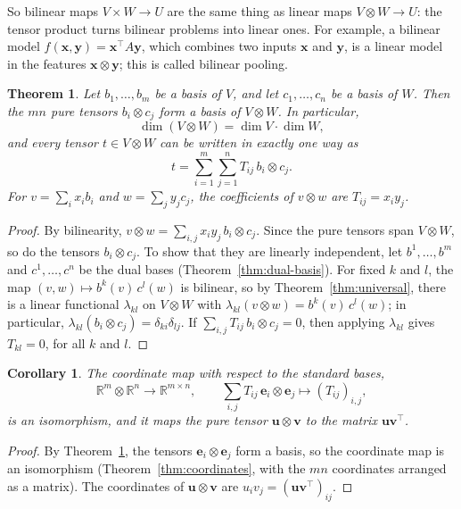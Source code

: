 \documentclass[11pt]{article}
\theoremstyle{definition}
\theoremstyle{plain}
\newtheorem{theorem}[definition]{Theorem}
\newtheorem{corollary}[definition]{Corollary}
\theoremstyle{remark}
\begin{document}
So bilinear maps $V \times W \to U$ are the same thing as linear maps $V \otimes W \to U$: the tensor product turns bilinear problems into linear ones. For example, a bilinear model $f(\mathbf{x}, \mathbf{y}) = \mathbf{x}^\top A\mathbf{y}$, which combines two inputs $\mathbf{x}$ and $\mathbf{y}$, is a linear model in the features $\mathbf{x} \otimes \mathbf{y}$; this is called bilinear pooling.

\begin{theorem}\label{thm:tensor-basis}
    Let $b_1, \ldots, b_m$ be a basis of $V$, and let $c_1, \ldots, c_n$ be a basis of $W$. Then the $mn$ pure tensors $b_i \otimes c_j$ form a basis of $V \otimes W$. In particular,
    \[\dim(V \otimes W) = \dim V \cdot \dim W,\]
    and every tensor $t \in V \otimes W$ can be written in exactly one way as
    \[t = \sum_{i=1}^m \sum_{j=1}^n T_{ij}\, b_i \otimes c_j.\]
    For $v = \sum_i x_ib_i$ and $w = \sum_j y_jc_j$, the coefficients of $v \otimes w$ are $T_{ij} = x_iy_j$.
\end{theorem}

\begin{proof}
    By bilinearity, $v \otimes w = \sum_{i,j} x_iy_j\, b_i \otimes c_j$. Since the pure tensors span $V \otimes W$, so do the tensors $b_i \otimes c_j$. To show that they are linearly independent, let $b^1, \ldots, b^m$ and $c^1, \ldots, c^n$ be the dual bases (Theorem~\ref{thm:dual-basis}). For fixed $k$ and $l$, the map $(v, w) \mapsto b^k(v)\,c^l(w)$ is bilinear, so by Theorem~\ref{thm:universal}, there is a linear functional $\lambda_{kl}$ on $V \otimes W$ with $\lambda_{kl}(v \otimes w) = b^k(v)\,c^l(w)$; in particular, $\lambda_{kl}(b_i \otimes c_j) = \delta_{ki}\delta_{lj}$. If $\sum_{i,j} T_{ij}\, b_i \otimes c_j = 0$, then applying $\lambda_{kl}$ gives $T_{kl} = 0$, for all $k$ and $l$.
\end{proof}

\begin{corollary}\label{cor:tensor-matrices}
    The coordinate map with respect to the standard bases,
    \[\mathbb{R}^m \otimes \mathbb{R}^n \to \mathbb{R}^{m \times n}, \qquad \sum_{i,j} T_{ij}\, \mathbf{e}_i \otimes \mathbf{e}_j \mapsto (T_{ij})_{i,j},\]
    is an isomorphism, and it maps the pure tensor $\mathbf{u} \otimes \mathbf{v}$ to the matrix $\mathbf{u}\mathbf{v}^\top$.
\end{corollary}

\begin{proof}
    By Theorem~\ref{thm:tensor-basis}, the tensors $\mathbf{e}_i \otimes \mathbf{e}_j$ form a basis, so the coordinate map is an isomorphism (Theorem~\ref{thm:coordinates}, with the $mn$ coordinates arranged as a matrix). The coordinates of $\mathbf{u} \otimes \mathbf{v}$ are $u_iv_j = (\mathbf{u}\mathbf{v}^\top)_{ij}$.
\end{proof}
\end{document}
